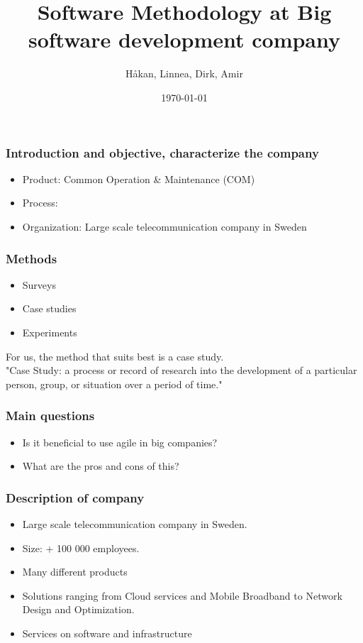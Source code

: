 \documentclass{beamer}
\begin{document}



\title{Software Methodology at Big software development company}
\author{H\aa kan, Linnea, Dirk, Amir}

\date{\today}

\begin{frame}
\titlepage
\end{frame}

\begin{frame}\frametitle{Introduction and objective, characterize the company}
\begin{itemize}
\item Product: Common Operation \& Maintenance (COM)
\item Process:
\item Organization: Large scale telecommunication company in Sweden
\end{itemize}
\end{frame}

\begin{frame}
  \frametitle{Methods}
  \begin{itemize}
  \item Surveys
   \item Case studies
   \item Experiments
  \end{itemize}
  For us, the method that suits best is a case study. \\
  "Case Study: a process or record of research into the development of a particular person, group, or situation over a period of time."
\end{frame}

\begin{frame}
  \frametitle{Main questions}
  \begin{itemize}
  \item Is it beneficial to use agile in big companies?
  \item What are the pros and cons of this?
  \end{itemize}
\end{frame}

\begin{frame}
  \frametitle{Description of company}
  \begin{itemize}
  \item  Large scale telecommunication company in Sweden.
  \item Size: + 100 000 employees.
  \item Many different products
  \item Solutions ranging from Cloud services and Mobile Broadband to Network Design and Optimization.
  \item Services on software and infrastructure
  
  \end{itemize}
\end{frame}
\end{document}
